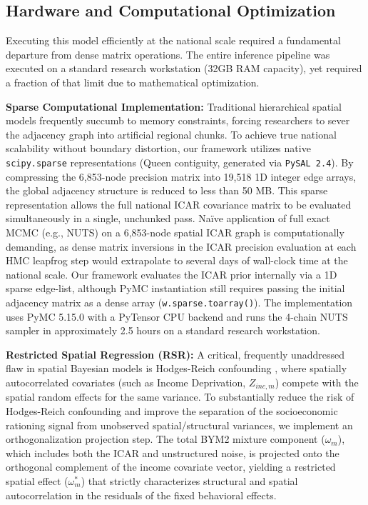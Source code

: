 \documentclass[11pt, a4paper, twocolumn, numbers]{elsarticle}
\begin{document}
\subsection{Hardware and Computational 
Optimization}\label{hardware-and-computational-optimization}

Executing this model efficiently at the national scale required a fundamental departure from dense matrix operations. The entire inference pipeline was executed on a standard research workstation (32GB RAM capacity), yet required a fraction of that limit due to mathematical optimization.

\textbf{Sparse Computational Implementation:} Traditional hierarchical spatial models frequently succumb to memory constraints, forcing researchers to sever the adjacency graph into artificial regional chunks. To achieve true national scalability without boundary distortion, our framework utilizes native \texttt{scipy.sparse} representations (Queen contiguity, generated via \texttt{PySAL 2.4}). By compressing the 6,853-node precision matrix into 19,518 1D integer edge arrays, the global adjacency structure is reduced to less than 50 MB. This sparse representation allows the full national ICAR covariance matrix to be evaluated simultaneously in a single, unchunked pass. Naïve application of full exact MCMC (e.g., NUTS) on a 6,853-node spatial ICAR graph is computationally demanding, as dense matrix inversions in the ICAR precision evaluation at each HMC leapfrog step would extrapolate to several days of wall-clock time at the national scale. Our framework evaluates the ICAR prior internally via a 1D sparse edge-list, although PyMC instantiation still requires passing the initial adjacency matrix as a dense array (\texttt{w.sparse.toarray()}). The implementation uses PyMC 5.15.0 with a PyTensor CPU backend and runs the 4-chain NUTS sampler in approximately 2.5 hours on a standard research workstation.

\textbf{Restricted Spatial Regression (RSR):} A critical, frequently unaddressed flaw in spatial Bayesian models is Hodges-Reich confounding \cite{Hodges2010}, where spatially autocorrelated covariates (such as Income Deprivation, $Z_{inc,m}$) compete with the spatial random effects for the same variance. To substantially reduce the risk of Hodges-Reich confounding and improve the separation of the socioeconomic rationing signal from unobserved spatial/structural variances, we implement an orthogonalization projection step. The total BYM2 mixture component ($\omega_m$), which includes both the ICAR and unstructured noise, is projected onto the orthogonal complement of the income covariate vector, yielding a restricted spatial effect ($\omega^*_m$) that strictly characterizes structural and spatial autocorrelation in the residuals of the fixed behavioral effects.
\end{document}
